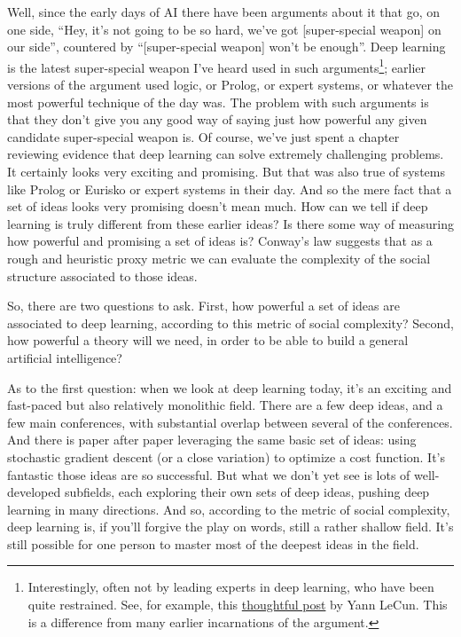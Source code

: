 \documentclass[a4paper,twoside,10pt]{book}
\begin{document}
Well, since the early days of AI there have been arguments about it that go, on one side, ``Hey, it's not going to be so hard, we've got [super-special weapon] on our side'', countered by ``[super-special weapon] won't be enough''. Deep learning is the latest super-special weapon I've heard used in such arguments\footnote{Interestingly, often not by leading experts in deep learning, who have been quite restrained. See, for example, this \href{https://www.facebook.com/yann.lecun/posts/10152348155137143}{thoughtful post} by Yann LeCun. This is a difference from many earlier incarnations of the argument.}; earlier versions of the argument used logic, or Prolog, or expert systems, or whatever the most powerful technique of the day was. The problem with such arguments is that they don't give you any good way of saying just how powerful any given candidate super-special weapon is. Of course, we've just spent a chapter reviewing evidence that deep learning can solve extremely challenging problems. It certainly looks very exciting and promising. But that was also true of systems like Prolog or Eurisko or expert systems in their day. And so the mere fact that a set of ideas looks very promising doesn't mean much. How can we tell if deep learning is truly different from these earlier ideas? Is there some way of measuring how powerful and promising a set of ideas is? Conway's law suggests that as a rough and heuristic proxy metric we can evaluate the complexity of the social structure associated to those ideas.

So, there are two questions to ask. First, how powerful a set of ideas are associated to deep learning, according to this metric of social complexity? Second, how powerful a theory will we need, in order to be able to build a general artificial intelligence?

As to the first question: when we look at deep learning today, it's an exciting and fast-paced but also relatively monolithic field. There are a few deep ideas, and a few main conferences, with substantial overlap between several of the conferences. And there is paper after paper leveraging the same basic set of ideas: using stochastic gradient descent (or a close variation) to optimize a cost function. It's fantastic those ideas are so successful. But what we don't yet see is lots of well-developed subfields, each exploring their own sets of deep ideas, pushing deep learning in many directions. And so, according to the metric of social complexity, deep learning is, if you'll forgive the play on words, still a rather shallow field. It's still possible for one person to master most of the deepest ideas in the field.
\end{document}
